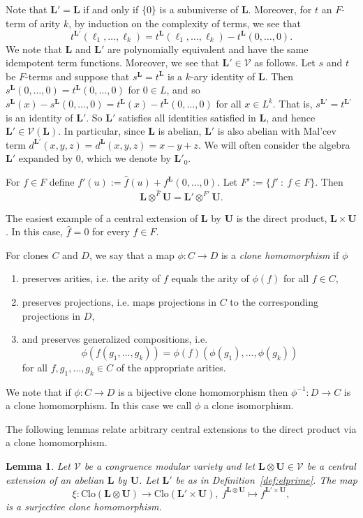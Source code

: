 \documentclass[12pt]{amsart}
\numberwithin{equation}{section}
\theoremstyle{plain}
\newtheorem{lemma}[theorem]{Lemma}
\theoremstyle{definition}
\newcommand{\st}{\ :\ }
\renewcommand{\L}{\mathbf{L}}
\newcommand{\U}{\mathbf{U}}
\newcommand{\V}{\mathcal{V}}
\newcommand{\Clo}{\mathrm{Clo}}
\begin{document}
Note that $\L' = \L$ if and only if $\{0\}$ is a subuniverse of $\L$. 
Moreover, for $t$ an $F$-term of arity $k$,  by induction on the complexity of terms, we see that 
  \[t^{\L'}(\ell_1, \ldots,\ell_k) = t^\L(\ell_1, \ldots, \ell_k) - t^\L(0, \ldots, 0).\] 
We note that $\L$ and $\L'$ are polynomially equivalent and have the same idempotent term functions. 
Moreover, we see that $\L' \in \V$ as follows.
Let $s$ and $t$ be $F$-terms and suppose that $s^\L = t^\L$ is a $k$-ary identity of $\L$.
Then $s^\L(0, \dots, 0) = t^\L(0, \dots, 0)$ for $0 \in L$,
  and so $s^\L(x) - s^\L(0, \dots, 0) = t^\L(x) - t^\L(0, \dots,0)$ for all $x \in L^k$. 
That is, $s^{\L'} = t^{\L'}$ is an identity of $\L'$.
So $\L'$ satisfies all identities satisfied in $\L$, and hence $\L' \in \V(\L)$. 
In particular, since $\L$ is abelian, $\L'$ is also abelian with Mal'cev term 
  $d^{\L'}(x,y,z) = d^\L(x,y,z) = x-y+z$.
We will often consider the algebra $\L'$ expanded by $0$, which we denote by $\L'_0$.
 
For $f\in F$ define $f'(u) := \hat{f}(u)+f^\L(0,\dots,0)$. 
Let $F' := \{f'\st f\in F\}$. 
Then
  \[ \L\otimes^{\hat{F}}\U = \L'\otimes^{F'}\U. \] 
 
The easiest example of a central extension of $\L$ by $\U$ is the direct product, $\L \times \U$. 
In this case, $\hat{f} = 0$ for every $f \in F$. 
 
For clones $C$ and $D$, we say that a map $\phi \colon C \rightarrow D$ is a \emph{clone homomorphism} if $\phi$
  \begin{enumerate}
    \item preserves arities, i.e. the arity of $f$ equals the arity of $\phi(f)$ for all $f \in C$,
    \item preserves projections, i.e. maps projections in $C$ to the corresponding projections in $D$,
    \item and preserves generalized compositions, i.e. \[\phi(f(g_1,\ldots,g_k)) = \phi(f)(\phi(g_1), \ldots, \phi(g_k)) \] 
      for all $f, g_1, \ldots, g_k \in C$ of the appropriate arities. 
  \end{enumerate}
We note that if $\phi \colon C \rightarrow D$ is a bijective clone homomorphism then $\phi^{-1} \colon D \rightarrow C$ 
  is a clone homomorphism.
In this case we call $\phi$ a clone isomorphism.
 
The following lemmas relate arbitrary central extensions to the direct product via a clone homomorphism. 
 
\begin{lemma} \label{lem:clonehom}
  Let $\V$ be a congruence modular variety and let $\L \otimes \U \in \V$ be a central extension 
    of an abelian $\L$ by $\U$. Let $\L'$ be as in Definition~\ref{def:elprime}. 
  The map
    \[ \xi\colon\Clo(\L\otimes\U) \to \Clo(\L'\times\U),\ f^{\L\otimes \U} \mapsto f^{\L'\times\U}, \]
    is a surjective clone homomorphism. 
\end{lemma}
\end{document}
